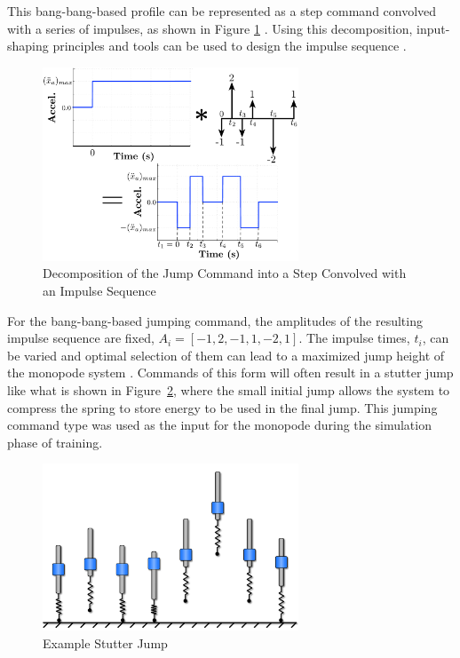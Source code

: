 \documentclass[10pt,twocolumn,letterpaper]{article}
\begin{document}
This bang-bang-based profile can be represented as a step command convolved with a series of impulses, as shown in Figure \ref{fig:jump_convolve} \cite{Sorensen2008CommandinducedVA}. Using this decomposition, input-shaping principles and tools can be used to design the impulse sequence \cite{Singer:90, Singhose:94a}. 
%
\begin{figure}[tbp]
\begin{center}
\includegraphics[width = 3.0in]{figures/input_shaping/Jump_convolve.pdf}
\caption{Decomposition of the Jump Command into a Step Convolved with an Impulse Sequence}
\label{fig:jump_convolve}
\end{center}
\end{figure}
%
For the bang-bang-based jumping command, the amplitudes of the resulting impulse sequence are fixed, $A_i = [-1, 2, -1, 1, -2, 1]$. The impulse times, $t_i$, can be varied and optimal selection of them can lead to a maximized jump height of the monopode system \cite{Vaughan2013}. Commands of this form will often result in a stutter jump like what is shown in Figure~\ref{fig:stutter_jump}, where the small initial jump allows the system to compress the spring to store energy to be used in the final jump. This jumping command type was used as the input for the monopode during the simulation phase of training.
%
\begin{figure}[t]
        \begin{center}
        \includegraphics[width=3in]{figures/Monopode_System/stutter_jump.png}
        \caption{Example Stutter Jump}
        \label{fig:stutter_jump} 
        \end{center}
\end{figure}
\end{document}
